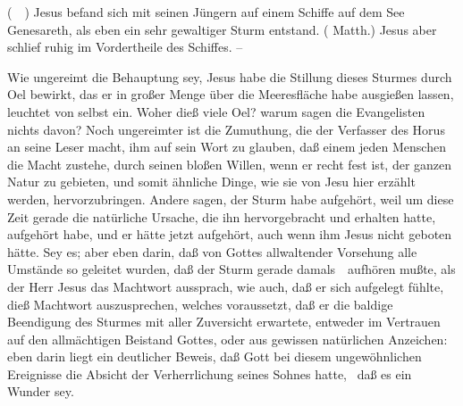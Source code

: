 \begin{aufza}
\item {} (\ \ ) Jesus befand sich mit seinen Jüngern auf einem Schiffe auf dem See Genesareth, als eben ein sehr gewaltiger Sturm entstand. ( Matth.) Jesus aber schlief ruhig im Vordertheile des Schiffes.  --\par
Wie ungereimt die Behauptung sey, Jesus habe die Stillung dieses Sturmes durch Oel bewirkt, das er in großer Menge über die Meeresfläche habe ausgießen lassen, leuchtet von selbst ein. Woher dieß viele Oel? warum sagen die Evangelisten nichts davon? Noch ungereimter ist die Zumuthung, die der Verfasser des Horus an seine Leser macht, ihm auf sein Wort zu glauben, daß einem jeden Menschen die Macht zustehe, durch seinen bloßen Willen, wenn er recht fest ist, der ganzen Natur zu gebieten, und somit ähnliche Dinge, wie sie von Jesu hier erzählt werden, hervorzubringen. Andere sagen, der Sturm habe aufgehört, weil um diese Zeit gerade die natürliche Ursache, die ihn hervorgebracht und erhalten hatte, aufgehört habe, und er hätte jetzt aufgehört, auch wenn ihm Jesus nicht geboten hätte. Sey es; aber eben darin, daß von Gottes allwaltender Vorsehung alle Umstände so geleitet wurden, daß der Sturm gerade damals~\ aufhören mußte, als der Herr Jesus das Machtwort aussprach, wie auch, daß er sich aufgelegt fühlte, dieß Machtwort auszusprechen, welches voraussetzt, daß er die baldige Beendigung des Sturmes mit aller Zuversicht erwartete, entweder im Vertrauen auf den allmächtigen Beistand Gottes, oder aus gewissen natürlichen Anzeichen: eben darin liegt ein deutlicher Beweis, daß Gott bei diesem ungewöhnlichen Ereignisse die Absicht der Verherrlichung seines Sohnes hatte, \dh\ daß es ein Wunder sey.

\end{aufza}
